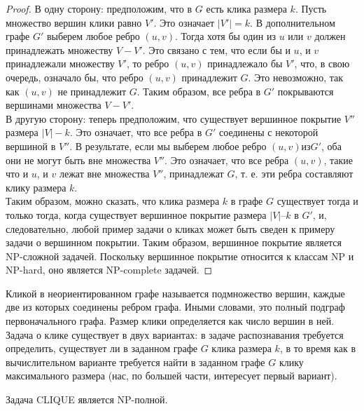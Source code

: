\begin{proof}
        В одну сторону: предположим, что в $G$ есть клика размера $k$. Пусть множество вершин клики равно $V'$. Это означает $|V'| = k$. В дополнительном графе $G'$ выберем любое ребро $(u, v)$. Тогда хотя бы один из $u$ или $v$ должен принадлежать множеству $V - V'$. Это связано с тем, что если бы и $u$, и $v$ принадлежали множеству $V'$, то ребро $(u, v)$ принадлежало бы $V'$, что, в свою очередь, означало бы, что ребро $(u, v)$ принадлежит $G$. Это невозможно, так как $(u, v)$ не принадлежит $G$. Таким образом, все ребра в $G'$ покрываются вершинами множества $V - V'$.\\
        В другую сторону: теперь предположим, что существует вершинное покрытие $V''$ размера $|V| - k$. Это означает, что все ребра в $G'$ соединены с некоторой вершиной в $V''$. В результате, если мы выберем любое ребро $(u, v) из G'$, оба они не могут быть вне множества $V''$. Это означает, что все
        ребра $(u, v)$, такие что и $u$, и $v$ лежат вне множества $V''$, принадлежат $G$, т. е. эти ребра составляют клику размера $k$.\\
        Таким образом, можно сказать, что клика размера $k$ в графе $G$ существует тогда и только тогда, когда существует вершинное покрытие размера $|V| – k$ в $G'$, и, следовательно, любой пример задачи о кликах может быть сведен к примеру задачи о вершинном покрытии. Таким образом, вершинное покрытие является NP-сложной задачей. Поскольку вершинное покрытие относится к классам NP и NP-hard, оно является NP-complete задачей.
    \end{proof}
    \begin{Def}
        Кликой в неориентированном графе называется подмножество вершин, каждые две из которых соединены ребром графа. Иными словами, это полный подграф первоначального графа. Размер клики определяется как число вершин в ней. Задача о клике существует в двух вариантах: в задаче распознавания требуется определить, существует ли в заданном графе $G$ клика размера $k$, в то время как в вычислительном варианте требуется найти в заданном графе $G$ клику максимального размера (нас, по большей части, интересует первый вариант).
    \end{Def}
    \begin{Thm}
        Задача CLIQUE является NP-полной.
    \end{Thm}
